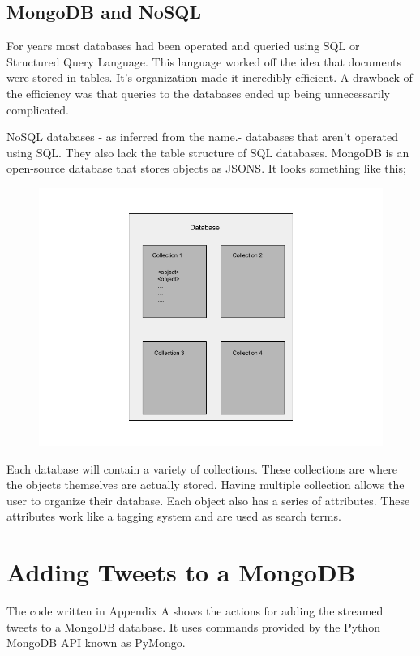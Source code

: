 \documentclass[11pt, twoside, reqno]{book}
\begin{document}
\subsection{MongoDB and NoSQL}
\hspace{0.1in} For years most databases had been operated and queried using SQL or Structured Query Language. This language worked off the idea that documents were stored in tables. It's organization made it incredibly efficient. A drawback of the efficiency was that queries to the databases ended up being unnecessarily complicated. 

NoSQL databases - as inferred from the name.- databases that aren't operated using SQL. They also lack the table structure of SQL databases. MongoDB is an open-source database that stores objects as JSONS. It looks something like this;

\begin{figure}[h]
	\includegraphics[scale=0.5]{database}
\end{figure}

Each database will contain a variety of collections. These collections are where the objects themselves are actually stored. Having multiple collection allows the user to organize their database. Each object also has a series of attributes. These attributes work like a tagging system and are used as search terms. 

\section{Adding Tweets to a MongoDB}
\hspace{0.1in}The code written in Appendix A shows the actions for adding the streamed tweets to a MongoDB database. It uses commands provided by the Python MongoDB API known as PyMongo. 
\end{document}
